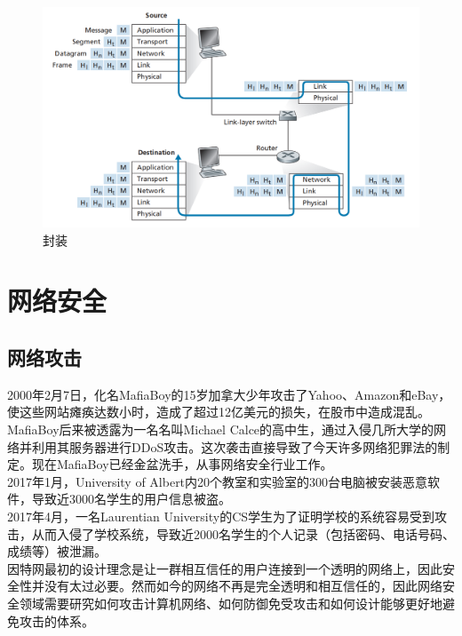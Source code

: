 \begin{figure}[H]
    \centering
    \includegraphics[scale=0.4]{img/C1/1-3/1.png}
    \caption{封装}
\end{figure}

\newpage

\section{网络安全}

\subsection{网络攻击}

2000年2月7日，化名MafiaBoy的15岁加拿大少年攻击了Yahoo、Amazon和eBay，使这些网站瘫痪达数小时，造成了超过12亿美元的损失，在股市中造成混乱。MafiaBoy后来被透露为一名名叫Michael Calce的高中生，通过入侵几所大学的网络并利用其服务器进行DDoS攻击。这次袭击直接导致了今天许多网络犯罪法的制定。现在MafiaBoy已经金盆洗手，从事网络安全行业工作。\\

2017年1月，University of Albert内20个教室和实验室的300台电脑被安装恶意软件，导致近3000名学生的用户信息被盗。\\

2017年4月，一名Laurentian University的CS学生为了证明学校的系统容易受到攻击，从而入侵了学校系统，导致近2000名学生的个人记录（包括密码、电话号码、成绩等）被泄漏。\\

因特网最初的设计理念是让一群相互信任的用户连接到一个透明的网络上，因此安全性并没有太过必要。然而如今的网络不再是完全透明和相互信任的，因此网络安全领域需要研究如何攻击计算机网络、如何防御免受攻击和如何设计能够更好地避免攻击的体系。\\

